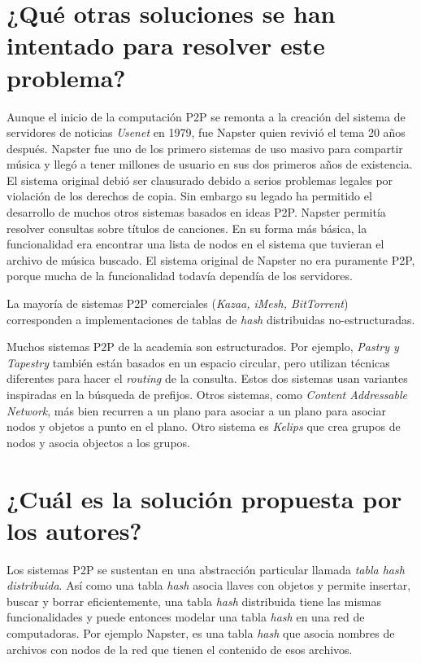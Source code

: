 \section{¿Qué otras soluciones se han intentado para resolver este problema?}
Aunque el inicio de la computación P2P se remonta a la creación del sistema de servidores de noticias \emph{Usenet} en 1979, fue Napster quien revivió el tema 20 años después. Napster fue uno de los primero sistemas de uso masivo para compartir música y llegó a tener millones de usuario en sus dos primeros años de existencia. El sistema original debió ser clausurado debido a serios problemas legales por violación de los derechos de copia. Sin embargo su legado ha permitido el desarrollo de muchos otros sistemas basados en ideas P2P. Napster permitía resolver consultas sobre títulos de canciones. En su forma más básica, la funcionalidad era encontrar una lista de nodos en el sistema que tuvieran el archivo de música buscado. El sistema original de Napster no era puramente P2P, porque mucha de la funcionalidad todavía dependía de los servidores.

La mayoría de sistemas P2P comerciales (\emph{Kazaa, iMesh, BitTorrent}) corresponden a implementaciones de tablas de \emph{hash} distribuidas no-estructuradas.

Muchos sistemas P2P de la academia son estructurados. Por ejemplo, \emph{Pastry \textnormal{y} Tapestry} también están basados en un espacio circular, pero utilizan técnicas diferentes para hacer el \emph{routing} de la consulta. Estos dos sistemas usan variantes inspiradas en la búsqueda de prefijos. Otros sistemas, como \emph{Content Addressable Network}, más bien recurren a un plano para asociar a un plano para asociar nodos y objetos a punto en el plano. Otro sistema es \emph{Kelips} que crea grupos de nodos y asocia objectos a los grupos.
     
\section{¿Cuál es la solución propuesta por los autores?}
Los sistemas P2P se sustentan en una abstracción particular llamada \emph{tabla hash distribuida}. Así como una tabla \emph{hash} asocia llaves con objetos y permite insertar, buscar y borrar eficientemente, una tabla \emph{hash} distribuida tiene las mismas funcionalidades y puede entonces modelar una tabla \emph{hash} en una red de computadoras. Por ejemplo Napster, es una tabla \emph{hash} que asocia nombres de archivos con nodos de la red que tienen el contenido de esos archivos.

